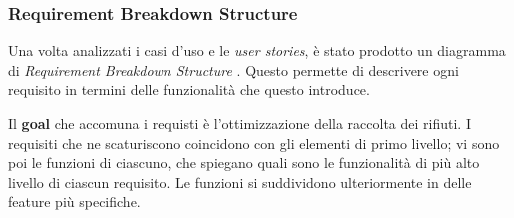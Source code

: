 \subsubsection{Requirement Breakdown Structure}\label{sec:rbs}
Una volta analizzati i casi d'uso e le \textit{user stories}, è stato prodotto un diagramma di \textit{Requirement Breakdown Structure} . Questo permette di descrivere ogni requisito in termini delle funzionalità che questo introduce.

Il \textbf{goal} che accomuna i requisti è l'ottimizzazione della raccolta dei rifiuti. I requisiti che ne scaturiscono coincidono con gli elementi di primo livello; vi sono poi le funzioni di ciascuno, che spiegano quali sono le funzionalità di più alto livello di ciascun requisito. Le funzioni si suddividono ulteriormente in delle feature più specifiche.

